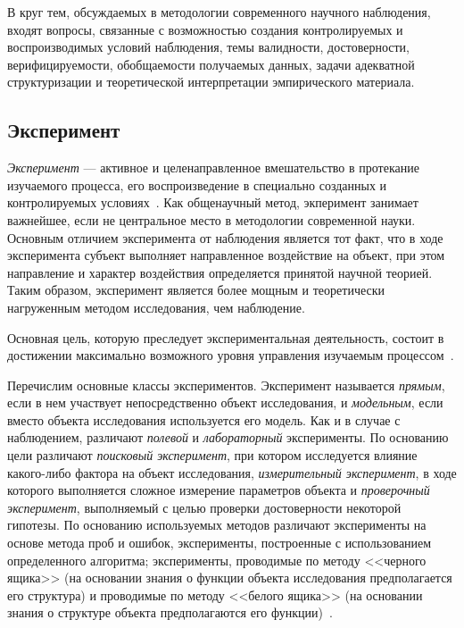 В круг тем, обсуждаемых в методологии современного научного наблюдения,
входят вопросы, связанные с возможностью создания контролируемых и
воспроизводимых условий наблюдения, темы валидности, достоверности, верифицируемости,
обобщаемости получаемых данных, задачи адекватной структуризации
и теоретической интерпретации эмпирического материала.

\pagebreak

\subsection{Эксперимент}

\emph{Эксперимент} --- активное и целенаправленное вмешательство в протекание изучаемого процесса,
его воспроизведение в специально созданных и контролируемых условиях~\cite{nekrasov2010}.
Как общенаучный метод, экперимент занимает важнейшее,
если не центральное место в методологии современной науки.
Основным отличием эксперимента от наблюдения является тот факт, что в ходе эксперимента
субъект выполняет направленное воздействие на объект, при этом направление и характер
воздействия определяется принятой научной теорией.
Таким образом, эксперимент является более мощным и теоретически нагруженным методом исследования,
чем наблюдение.

Основная цель, которую преследует экспериментальная деятельность,
состоит в достижении максимально возможного уровня
управления изучаемым процессом~\cite{ushakov2008}.

Перечислим основные классы экспериментов.
Эксперимент называется \emph{прямым}, если в нем участвует непосредственно объект исследования,
и \emph{модельным}, если вместо объекта исследования используется его модель.
Как и в случае с наблюдением, различают \emph{полевой} и \emph{лабораторный} эксперименты.
По основанию цели различают \emph{поисковый эксперимент}, при котором исследуется влияние
какого-либо фактора на объект исследования,
\emph{измерительный эксперимент}, в ходе которого выполняется сложное измерение
параметров объекта и \textit{проверочный эксперимент}, выполняемый с целью проверки
достоверности некоторой гипотезы.
По основанию используемых методов различают эксперименты на основе метода проб и ошибок,
эксперименты, построенные с использованием определенного алгоритма;
эксперименты, проводимые по методу <<черного ящика>>
(на основании знания о функции объекта исследования предполагается его структура) и
проводимые по методу <<белого ящика>>
(на основании знания о структуре объекта предполагаются его функции)~\cite{moiseev2004}.

